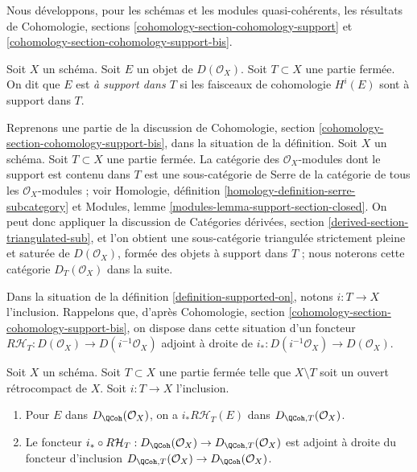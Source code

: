 \noindent
Nous développons, pour les schémas et les modules quasi-cohérents,
les résultats de Cohomologie, sections
\ref{cohomology-section-cohomology-support} et
\ref{cohomology-section-cohomology-support-bis}.

\begin{definition}
\label{definition-supported-on}
Soit $X$ un schéma. Soit $E$ un objet de $D(\mathcal{O}_X)$.
Soit $T \subset X$ une partie fermée.
On dit que $E$ est {\it à support dans $T$} si les
faisceaux de cohomologie $H^i(E)$ sont à support dans $T$.
\end{definition}

\noindent
Reprenons une partie de la discussion de
Cohomologie, section \ref{cohomology-section-cohomology-support-bis},
dans la situation de la définition.
Soit $X$ un schéma. Soit $T \subset X$ une partie fermée.
La catégorie des $\mathcal{O}_X$-modules dont le
support est contenu dans $T$ est une sous-catégorie de Serre de la
catégorie de tous les $\mathcal{O}_X$-modules ; voir
Homologie, définition \ref{homology-definition-serre-subcategory}
et
Modules, lemme \ref{modules-lemma-support-section-closed}.
On peut donc appliquer la discussion de
Catégories dérivées, section \ref{derived-section-triangulated-sub},
et l'on obtient une sous-catégorie triangulée strictement pleine et saturée de
$D(\mathcal{O}_X)$, formée des objets à support dans $T$ ; nous
noterons cette catégorie $D_T(\mathcal{O}_X)$ dans la suite.

\medskip\noindent
Dans la situation de la définition \ref{definition-supported-on},
notons $i : T \to X$ l'inclusion. Rappelons que, d'après
Cohomologie, section \ref{cohomology-section-cohomology-support-bis},
on dispose dans cette situation d'un foncteur
$R\mathcal{H}_T : D(\mathcal{O}_X) \to D(i^{-1}\mathcal{O}_X)$
adjoint à droite de $i_* : D(i^{-1}\mathcal{O}_X) \to D(\mathcal{O}_X)$.

\begin{lemma}
\label{lemma-support-quasi-coherent}
Soit $X$ un schéma. Soit $T \subset X$ une partie fermée telle que
$X \setminus T$ soit un ouvert rétrocompact de $X$. Soit $i : T \to X$
l'inclusion.
\begin{enumerate}
\item Pour $E$ dans $D_\QCoh(\mathcal{O}_X)$, on a
$i_*R\mathcal{H}_T(E)$ dans $D_{\QCoh, T}(\mathcal{O}_X)$.
\item Le foncteur
$i_* \circ R\mathcal{H}_T : D_\QCoh(\mathcal{O}_X) \to
D_{\QCoh, T}(\mathcal{O}_X)$ est adjoint à droite du foncteur d'inclusion
$D_{\QCoh, T}(\mathcal{O}_X) \to D_\QCoh(\mathcal{O}_X)$.
\end{enumerate}
\end{lemma}

